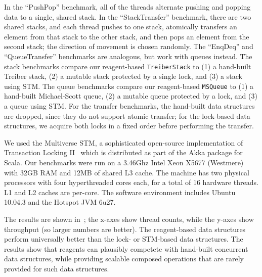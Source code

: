 \documentclass[preprint,nocopyrightspace]{sigplanconf}
\begin{document}
In the ``PushPop'' benchmark, all of the threads alternate pushing and popping
data to a single, shared stack.  In the ``StackTransfer'' benchmark, there are
two shared stacks, and each thread pushes to one stack, atomically transfers an
element from that stack to the other stack, and then pops an element from the
second stack; the direction of movement is chosen randomly.  The ``EnqDeq'' and
``QueueTransfer'' benchmarks are analogous, but work with queues instead.  The
stack benchmarks compare our reagent-based \lstinline{TreiberStack} to (1) a
hand-built Treiber stack, (2) a mutable stack protected by a single lock, and
(3) a stack using STM.  The queue benchmarks compare our reagent-based
\lstinline{MSQueue} to (1) a hand-built Michael-Scott queue, (2) a mutable queue
protected by a lock, and (3) a queue using STM.  For the transfer benchmarks,
the hand-built data structures are dropped, since they do not support atomic
transfer; for the lock-based data structures, we acquire both locks in a fixed
order before performing the transfer.

We used the Multiverse STM, a sophisticated open-source implementation of
Transaction Locking II~\cite{Dice2006a} which is distributed as part of the Akka
package for Scala.  Our benchmarks were run on a 3.46Ghz Intel Xeon X5677
(Westmere) with 32GB RAM and 12MB of shared L3 cache.  The machine has two
physical processors with four hyperthreaded cores each, for a total of 16
hardware threads.  L1 and L2 caches are per-core.  The software environment
includes Ubuntu 10.04.3 and the Hotspot JVM 6u27.


The results are shown in~; the x-axes show thread counts, while the
y-axes show throughput (so larger numbers are better).  The reagent-based data
structures perform universally better than the lock- or STM-based data
structures.  The results show that reagents can plausibly competete with
hand-built concurrent data structures, while providing scalable composed
operations that are rarely provided for such data structures.

\end{document}

